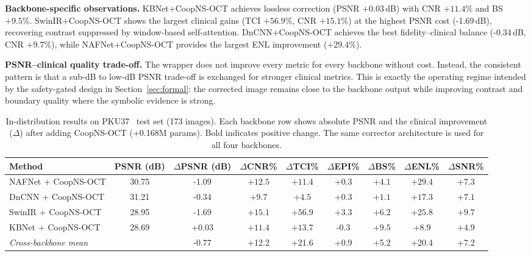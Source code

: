 \documentclass{ieeetj}
\begin{document}
\textbf{Backbone-specific observations.} KBNet+CoopNS-OCT achieves lossless correction (PSNR $+0.03$\,dB) with CNR $+11.4\%$ and BS $+9.5\%$. SwinIR+CoopNS-OCT shows the largest clinical gains (TCI $+56.9\%$, CNR $+15.1\%$) at the highest PSNR cost (-1.69\,dB), recovering contrast suppressed by window-based self-attention. DnCNN+CoopNS-OCT achieves the best fidelity--clinical balance (-0.34\,dB, CNR $+9.7\%$), while NAFNet+CoopNS-OCT provides the largest ENL improvement ($+29.4\%$).

\textbf{PSNR--clinical quality trade-off.} The wrapper does not improve every metric for every backbone without cost. Instead, the consistent pattern is that a sub-dB to low-dB PSNR trade-off is exchanged for stronger clinical metrics. This is exactly the operating regime intended by the safety-gated design in Section~\ref{sec:formal}: the corrected image remains close to the backbone output while improving contrast and boundary quality where the symbolic evidence is strong.

\begin{table}[t]
\centering
\caption{In-distribution results on PKU37~\cite{geng2022triplet} test set (173 images). Each backbone row shows absolute PSNR and the clinical improvement ($\Delta$) after adding CoopNS-OCT (+0.168M params). Bold indicates positive change. The same corrector architecture is used for all four backbones.}
\label{tab:pku37_combined}
\setlength{\tabcolsep}{4pt}
\begin{tabular}{lcccccccc}
\toprule
Method & PSNR (dB) & $\Delta$PSNR (dB) & $\Delta$CNR\% & $\Delta$TCI\% & $\Delta$EPI\% & $\Delta$BS\% & $\Delta$ENL\% & $\Delta$SNR\% \\
\midrule
NAFNet + CoopNS-OCT & 30.75 & -1.09 & $\mathbf{+12.5}$ & $\mathbf{+11.4}$ & $\mathbf{+0.3}$ & $\mathbf{+4.1}$ & $\mathbf{+29.4}$ & $\mathbf{+7.3}$ \\
DnCNN + CoopNS-OCT & 31.21 & -0.34 & $\mathbf{+9.7}$ & $\mathbf{+4.5}$ & $\mathbf{+0.3}$ & $\mathbf{+1.1}$ & $\mathbf{+17.3}$ & $\mathbf{+7.1}$ \\
SwinIR + CoopNS-OCT & 28.95 & -1.69 & $\mathbf{+15.1}$ & $\mathbf{+56.9}$ & $\mathbf{+3.3}$ & $\mathbf{+6.2}$ & $\mathbf{+25.8}$ & $\mathbf{+9.7}$ \\
KBNet + CoopNS-OCT & 28.69 & +0.03 & $\mathbf{+11.4}$ & $\mathbf{+13.7}$ & -0.3 & $\mathbf{+9.5}$ & $\mathbf{+8.9}$ & $\mathbf{+4.9}$ \\
\midrule
\textit{Cross-backbone mean} & & -0.77 & +12.2 & +21.6 & +0.9 & +5.2 & +20.4 & +7.2 \\
\bottomrule
\end{tabular}
\end{table}
\end{document}
